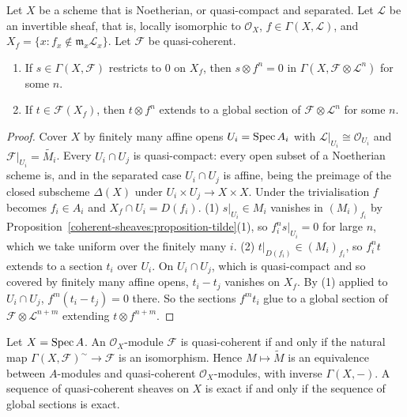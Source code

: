 \begin{lemma}\label{coherent-sheaves:lemma-extend-sections}
Let $X$ be a scheme that is Noetherian, or quasi-compact and separated. Let $\mathcal{L}$ be an invertible sheaf, that is, locally isomorphic to $\mathcal{O}_X$, $f \in \Gamma(X, \mathcal{L})$, and
$X_f = \{x : f_x \notin \mathfrak{m}_x\mathcal{L}_x\}$. Let $\mathcal{F}$ be quasi-coherent.
\begin{enumerate}
\item If $s \in \Gamma(X, \mathcal{F})$ restricts to $0$ on $X_f$, then $s \otimes f^n = 0$ in $\Gamma(X, \mathcal{F} \otimes \mathcal{L}^n)$ for some $n$.
\item If $t \in \mathcal{F}(X_f)$, then $t \otimes f^n$ extends to a global section of $\mathcal{F} \otimes \mathcal{L}^n$ for some $n$.
\end{enumerate}
\end{lemma}

\begin{proof}
Cover $X$ by finitely many affine opens $U_i = \operatorname{Spec} A_i$ with $\mathcal{L}|_{U_i} \cong \mathcal{O}_{U_i}$ and $\mathcal{F}|_{U_i} = \widetilde{M_i}$. Every
$U_i \cap U_j$ is quasi-compact: every open subset of a Noetherian scheme is, and in the separated case $U_i \cap U_j$ is affine, being the preimage of
the closed subscheme $\Delta(X)$ under $U_i \times U_j \to X \times X$. Under the trivialisation $f$ becomes $f_i \in A_i$ and
$X_f \cap U_i = D(f_i)$. (1) $s|_{U_i} \in M_i$ vanishes in $(M_i)_{f_i}$ by Proposition~\ref{coherent-sheaves:proposition-tilde}(1), so $f_i^ns|_{U_i} = 0$ for
large $n$, which we take uniform over the finitely many $i$. (2) $t|_{D(f_i)} \in (M_i)_{f_i}$, so $f_i^nt$ extends to a section $t_i$ over $U_i$. On
$U_i \cap U_j$, which is quasi-compact and so covered by finitely many affine opens, $t_i - t_j$ vanishes on $X_f$. By (1) applied to $U_i \cap U_j$,
$f^m(t_i - t_j) = 0$ there. So the sections $f^mt_i$ glue to a global section of $\mathcal{F} \otimes \mathcal{L}^{n+m}$ extending $t \otimes f^{n+m}$.
\end{proof}

\begin{theorem}\label{coherent-sheaves:theorem-affine}
Let $X = \operatorname{Spec} A$. An $\mathcal{O}_X$-module $\mathcal{F}$ is quasi-coherent if and only if the natural map $\Gamma(X, \mathcal{F})^\sim \to \mathcal{F}$ is an
isomorphism. Hence $M \mapsto \widetilde M$ is an equivalence between $A$-modules and quasi-coherent $\mathcal{O}_X$-modules, with inverse $\Gamma(X, -)$. A
sequence of quasi-coherent sheaves on $X$ is exact if and only if the sequence of global sections is exact.
\end{theorem}

